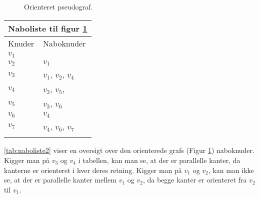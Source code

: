 \begin{figure}[H]
  \centering
  \caption{Orienteret pseudograf.}
  \label{fig:orienteretmulti}
\end{figure}
\begin{center}
	\begin{tabular}{ |p{4cm}||p{3cm}|}
	 	\hline
 		\multicolumn{2}{|c|}{Naboliste til figur \ref{fig:orienteretmulti}} \\
 		\hline
 		Knuder & Naboknuder\\
 		\hline
 		$v_1$ & \\
		$v_2$ & $v_1$ \\
		$v_3$ & $v_1$, $v_2$, $v_4$ \\
		$v_4$ & $v_3$, $v_5$, \\
		$v_5$ & $v_3$, $v_6$ \\
		$v_6$ & $v_4$ \\
		$v_7$ & $v_4$, $v_6$, $v_7$ \\
 		\hline
		\label{tab:naboliste2}
	\end{tabular}
\end{center}
\ref{tab:naboliste2} viser en oversigt over den orienterede grafs (Figur \ref{fig:orienteretmulti}) naboknuder. Kigger man på $v_3$ og $v_4$ i tabellen, kan man se, at der er parallelle kanter, da kanterne er orienteret i hver deres retning. Kigger man på $v_1$ og $v_2$, kan man ikke se, at der er parallelle kanter mellem $v_1$ og $v_2$, da begge kanter er orienteret fra $v_2$ til $v_1$.